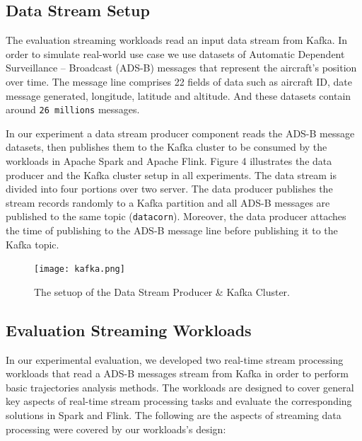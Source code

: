 \documentclass[]{article}
\begin{document}
\subsection{Data Stream Setup}
The evaluation streaming workloads read an input data stream from Kafka. In order to simulate real-world use case we use datasets of Automatic Dependent Surveillance – Broadcast (ADS-B) messages that represent the aircraft's position over time. The message line comprises 22 fields of data such as aircraft ID, date message generated, longitude, latitude and altitude.  And  these datasets contain around \texttt{26 millions} messages.  
\par In our experiment a data stream producer component reads the ADS-B message datasets, then publishes them to the Kafka cluster to be consumed by the workloads in Apache Spark and Apache Flink. Figure 4 illustrates the data producer and the Kafka cluster setup in all experiments.
The data stream is divided into four portions over two server. The data producer publishes the stream records randomly to a Kafka partition and all ADS-B messages are published to the same topic (\texttt{datacorn}). Moreover, the data producer attaches the time of publishing to the ADS-B message line before publishing it to the Kafka topic.

\begin{figure}[h]
 
  \centering
    \texttt{[image: kafka.png]}
     \caption{The setuop of the Data Stream Producer \& Kafka Cluster.}
\end{figure} 

\subsection{Evaluation Streaming Workloads}
In our experimental evaluation, we developed two real-time stream processing workloads that read a ADS-B messages stream from Kafka in order to perform basic trajectories analysis methods. The workloads are designed to cover general key aspects of real-time stream processing tasks and evaluate the corresponding solutions in Spark and Flink. The following are the aspects of streaming data processing were covered by our workloads's design: 
\end{document}
